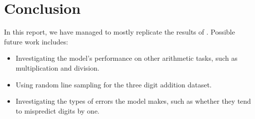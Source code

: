 \documentclass[12pt]{article}
\begin{document}
\section{Conclusion}
In this report, we have managed to mostly replicate the results of \cite{lee2023teaching}.
Possible future work includes:
\begin{itemize}
    \item Investigating the model's performance on other arithmetic tasks, such as multiplication and division.
    \item Using random line sampling for the three digit addition dataset.
    \item Investigating the types of errors the model makes, such as whether they tend to mispredict digits by one.
\end{itemize}



\end{document}
